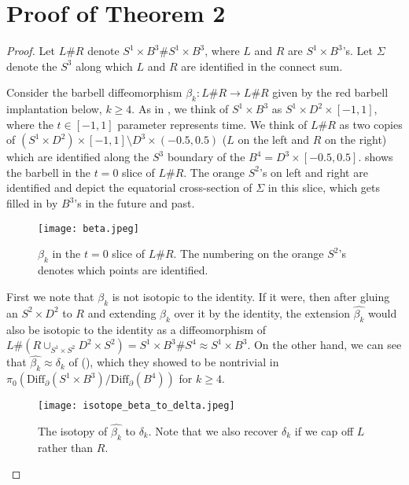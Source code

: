 \documentclass[11pt,letterpaper,twoside]{amsart}
\theoremstyle{definition}
\begin{document}
\section{Proof of Theorem 2}
\begin{proof}

    Let $L \# R$ denote $S^1 \times B^3 \# S^1 \times B^3$, where $L$ and $R$ are $S^1 \times B^3$'s. Let $\Sigma$ denote the $S^3$ along which $L$ and $R$ are identified in the connect sum.

    
    \noindent Consider the barbell diffeomorphism $\beta_k: L \# R \rightarrow L \# R$ given by the red barbell implantation below, $k\geq 4$. As in \cite{BG}, we think of $S^1 \times B^3$ as $S^1 \times D^2 \times [-1,1]$, where the $t\in[-1,1]$ parameter represents time. We think of $L \# R$ as two copies of $(S^1 \times D^2) \times [-1,1] \setminus D^3 \times (-0.5, 0.5)$ ($L$ on the left and $R$ on the right) which are identified along the $S^3$ boundary of the $B^4=D^3 \times [-0.5,0.5]$.  shows the barbell in the $t=0$ slice of $L\# R$. The orange $S^2$'s on left and right are identified and depict the equatorial cross-section of $\Sigma$ in this slice, which gets filled in by $B^3$'s in the future and past. 
    
    \begin{figure}[h!]
        \centering
        \texttt{[image: beta.jpeg]}
        \caption{$\beta_k$ in the $t=0$ slice of $L\# R$. The numbering on the orange $S^2$'s denotes which points are identified.}
        \label{beta}
    \end{figure}

    \noindent First we note that $\beta_k$ is not isotopic to the identity. If it were, then after gluing an $S^2 \times D^2$ to $R$ and extending $\beta_k$ over it by the identity, the extension $\hat{\beta_k}$ would also be isotopic to the identity as a diffeomorphism of $L \# (R \cup_{S^1 \times S^2}D^2 \times S^2)=S^1 \times B^3 \# S^4 \approx S^1 \times B^3$. On the other hand, we can see that $\hat{\beta_k} \approx  \delta_k$ of \cite{BG} (), which they showed to be nontrivial in $\pi_0(\text{Diff}_\partial(S^1 \times B^3)/\text{Diff}_\partial(B^4))$ for $k\geq 4$.
    
    \begin{figure}[h!]
        \centering
        \texttt{[image: isotope\_beta\_to\_delta.jpeg]}
        \caption{The isotopy of $\hat{\beta_k}$ to $\delta_k.$ Note that we also recover $\delta_k$ if we cap off $L$ rather than $R$.}
        \label{isotope beta to delta}
    \end{figure}


\end{proof}
\end{document}
